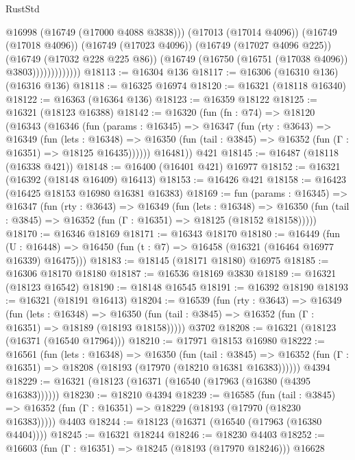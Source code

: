 \begin{lexlean}{RustStd}
\begin{coremodule}
                            @16998
                            (@16749 (@17000 @4088 @3838)))
                          (@17013 (@17014 @4096))
                          (@16749 (@17018 @4096))
                          (@16749 (@17023 @4096))
                          (@16749 (@17027 @4096 @225))
                          (@16749 (@17032 @228 @225 @86))
                          (@16749 (@16750 (@16751 (@17038 @4096)) @3803)))))))))))))
@18113 := @16304 @136
@18117 := @16306 (@16310 @136) (@16316 @136)
@18118 := @16325 @16974
@18120 := @16321 (@18118 @16340)
@18122 := @16363 (@16364 @136)
@18123 := @16359 @18122
@18125 := @16321 (@18123 @16388)
@18142 := @16320
    (fun (fn : @74) =>
    @18120
      (@16343
        (@16346
          (fun (params : @16345) =>
          @16347
            (fun (rty : @3643) =>
            @16349
              (fun (lets : @16348) =>
              @16350 (fun (tail : @3845) => @16352 (fun (Γ : @16351) => @18125 @16435))))))
        @16481))
    @421
@18145 := @16487 (@18118 (@16338 @421))
@18148 := @16400 (@16401 @421) @16977
@18152 := @16321 (@16392 (@18148 @16409) @16413)
@18153 := @16426 @421
@18158 := @16423 (@16425 @18153 @16980 @16381 @16383)
@18169 := fun (params : @16345) =>
  @16347
    (fun (rty : @3643) =>
    @16349
      (fun (lets : @16348) =>
      @16350 (fun (tail : @3845) => @16352 (fun (Γ : @16351) => @18125 (@18152 @18158)))))
@18170 := @16346 @18169
@18171 := @16343 @18170
@18180 := @16449
    (fun (U : @16448) => @16450 (fun (t : @7) => @16458 (@16321 (@16464 @16977 @16339) @16475)))
@18183 := @18145 (@18171 @18180) @16975
@18185 := @16306 @18170 @18180
@18187 := @16536 @18169 @3830
@18189 := @16321 (@18123 @16542)
@18190 := @18148 @16545
@18191 := @16392 @18190
@18193 := @16321 (@18191 @16413)
@18204 := @16539
    (fun (rty : @3643) =>
    @16349
      (fun (lets : @16348) =>
      @16350 (fun (tail : @3845) => @16352 (fun (Γ : @16351) => @18189 (@18193 @18158)))))
    @3702
@18208 := @16321 (@18123 (@16371 (@16540 @17964)))
@18210 := @17971 @18153 @16980
@18222 := @16561
    (fun (lets : @16348) =>
    @16350
      (fun (tail : @3845) =>
      @16352 (fun (Γ : @16351) => @18208 (@18193 (@17970 (@18210 @16381 @16383))))))
    @4394
@18229 := @16321 (@18123 (@16371 (@16540 (@17963 (@16380 (@4395 @16383))))))
@18230 := @18210 @4394
@18239 := @16585
    (fun (tail : @3845) => @16352 (fun (Γ : @16351) => @18229 (@18193 (@17970 (@18230 @16383)))))
    @4403
@18244 := @18123 (@16371 (@16540 (@17963 (@16380 @4404))))
@18245 := @16321 @18244
@18246 := @18230 @4403
@18252 := @16603 (fun (Γ : @16351) => @18245 (@18193 (@17970 @18246))) @16628

\end{coremodule}
\end{lexlean}
